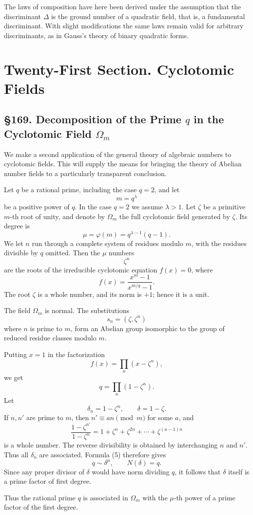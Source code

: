 \documentclass[11pt,a4paper]{book}
\newcommand{\webersection}[2]{\clearpage\section*{\S #1. #2}}
\newcommand{\booktitle}[1]{\clearpage\chapter*{#1}}
\begin{document}
The laws of composition have here been derived under the assumption that the discriminant \(\Delta\) is the ground number of a quadratic field, that is, a fundamental discriminant.  With slight modifications the same laws remain valid for arbitrary discriminants, as in Gauss's theory of binary quadratic forms.


\booktitle{Twenty-First Section. Cyclotomic Fields}

\webersection{169}{Decomposition of the Prime \(q\) in the Cyclotomic Field \(\Omega_m\)}

We make a second application of the general theory of algebraic numbers to cyclotomic fields.  This will supply the means for bringing the theory of Abelian number fields to a particularly transparent conclusion.

Let \(q\) be a rational prime, including the case \(q=2\), and let
\[
  m=q^\lambda
\tag{1}
\]
be a positive power of \(q\).  In the case \(q=2\) we assume \(\lambda>1\).  Let \(\zeta\) be a primitive \(m\)-th root of unity, and denote by \(\Omega_m\) the full cyclotomic field generated by \(\zeta\).  Its degree is
\[
  \mu=\varphi(m)=q^{\lambda-1}(q-1).
\tag{2}
\]
We let \(n\) run through a complete system of residues modulo \(m\), with the residues divisible by \(q\) omitted.  Then the \(\mu\) numbers
\[
  \zeta^n
\]
are the roots of the irreducible cyclotomic equation \(f(x)=0\), where
\[
  f(x)=\frac{x^m-1}{x^{m/q}-1}.
\tag{3}
\]
The root \(\zeta\) is a whole number, and its norm is \(+1\); hence it is a unit.

The field \(\Omega_m\) is normal.  The substitutions
\[
  s_n=(\zeta,\zeta^n)
\tag{4}
\]
where \(n\) is prime to \(m\), form an Abelian group isomorphic to the group of reduced residue classes modulo \(m\).

Putting \(x=1\) in the factorization
\[
  f(x)=\prod_n (x-\zeta^n),
\]
we get
\[
  q=\prod_n(1-\zeta^n).
\tag{5}
\]
Let
\[
  \delta_n=1-\zeta^n,\qquad \delta=1-\zeta.
\tag{6}
\]
If \(n,n'\) are prime to \(m\), then \(n'\equiv an\pmod m\) for some \(a\), and
\[
  \frac{1-\zeta^{n'}}{1-\zeta^n}
     =1+\zeta^n+\zeta^{2n}+\cdots+\zeta^{(a-1)n}
\]
is a whole number.  The reverse divisibility is obtained by interchanging \(n\) and \(n'\).  Thus all \(\delta_n\) are associated.  Formula (5) therefore gives
\[
  q\sim \delta^\mu,\qquad N(\delta)=q.
\tag{7}
\]
Since any proper divisor of \(\delta\) would have norm dividing \(q\), it follows that \(\delta\) itself is a prime factor of first degree.

Thus the rational prime \(q\) is associated in \(\Omega_m\) with the \(\mu\)-th power of a prime factor of the first degree.
\end{document}
